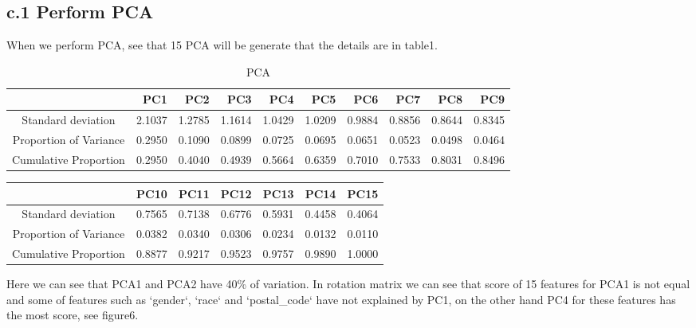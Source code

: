 \documentclass[a4paper, 11pt]{article}
\begin{document}
\subsection*{c.1  Perform PCA}
When we perform PCA, see that 15 PCA will be generate that the details are in table1.
\begin{table}[ht]
	\centering
			\caption{PCA}
	\label{table1}
	\begin{tabular}{crrrrrrrrr}
		\hline
		& PC1 & PC2 & PC3 & PC4 & PC5 & PC6 & PC7 & PC8 & PC9  \\ 
		\hline
		Standard deviation & 2.1037 & 1.2785 & 1.1614 & 1.0429 & 1.0209 & 0.9884 & 0.8856 & 0.8644 & 0.8345  \\ 
		Proportion of Variance & 0.2950 & 0.1090 & 0.0899 & 0.0725 & 0.0695 & 0.0651 & 0.0523 & 0.0498 & 0.0464  \\ 
		Cumulative Proportion & 0.2950 & 0.4040 & 0.4939 & 0.5664 & 0.6359 & 0.7010 & 0.7533 & 0.8031 & 0.8496 \\ 
		\hline
	\end{tabular}
\end{table}
\begin{table}[ht]
	\centering
	\begin{tabular}{crrrrrr}
		\hline
		& PC10 & PC11 & PC12 & PC13 & PC14 & PC15 \\ 
		\hline
		Standard deviation & 0.7565 & 0.7138 & 0.6776 & 0.5931 & 0.4458 & 0.4064 \\ 
		Proportion of Variance & 0.0382 & 0.0340 & 0.0306 & 0.0234 & 0.0132 & 0.0110 \\ 
		Cumulative Proportion & 0.8877 & 0.9217 & 0.9523 & 0.9757 & 0.9890 & 1.0000 \\ 
		\hline
	\end{tabular}
\end{table}
Here we can see that PCA1 and PCA2 have 40\% of variation. In rotation matrix we can see that score of 15 features for PCA1 is not equal and some of features such as `gender`, `race` and `postal\_code` have not explained by PC1, on the other hand PC4 for these features has the most score, see figure6.
\end{document}
